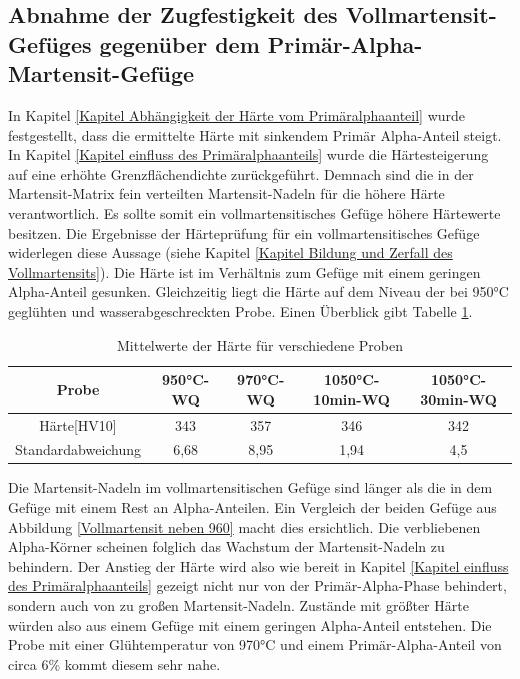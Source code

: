 \documentclass[a4paper, 11pt]{tubsreprt}
\begin{document}
\subsection*{Abnahme der Zugfestigkeit des Vollmartensit-Gefüges gegenüber dem Primär-Alpha-Martensit-Gefüge}
In Kapitel \ref{Kapitel Abhängigkeit der Härte vom Primäralphaanteil} wurde festgestellt, dass die ermittelte Härte mit sinkendem Primär Alpha-Anteil steigt. In Kapitel \ref{Kapitel einfluss des Primäralphaanteils} wurde die Härtesteigerung auf eine erhöhte Grenzflächendichte zurückgeführt. Demnach sind die in der Martensit-Matrix fein verteilten Martensit-Nadeln für die höhere Härte verantwortlich.
Es sollte somit ein vollmartensitisches Gefüge höhere Härtewerte besitzen.
Die Ergebnisse der Härteprüfung für ein vollmartensitisches Gefüge  widerlegen diese Aussage (siehe Kapitel \ref{Kapitel Bildung und Zerfall des Vollmartensits}). Die Härte ist im Verhältnis zum Gefüge mit einem geringen Alpha-Anteil gesunken. Gleichzeitig liegt die Härte auf dem Niveau der bei 950°C geglühten und wasserabgeschreckten Probe. Einen Überblick gibt Tabelle \ref{Tabelle Mittelwerte Härte für verschiedene Proben}.
\begin{table}
\begin{tabular}{c|c|c|c|c}
Probe & 950°C-WQ & 970°C-WQ & 1050°C-10min-WQ & 1050°C-30min-WQ \\
\hline
Härte[HV10] & 343 & 357 & 346 & 342 \\
\hline
Standardabweichung & 6,68 & 8,95 & 1,94 & 4,5 \\

\end{tabular}
\caption{Mittelwerte der Härte für verschiedene Proben}
\label{Tabelle Mittelwerte Härte für verschiedene Proben}
\end{table}

Die Martensit-Nadeln im vollmartensitischen Gefüge sind länger als die in dem Gefüge mit einem Rest an Alpha-Anteilen. Ein Vergleich der beiden Gefüge aus Abbildung \ref{Vollmartensit neben 960} macht dies ersichtlich. Die verbliebenen Alpha-Körner scheinen folglich das Wachstum der Martensit-Nadeln zu behindern. Der Anstieg der Härte wird also wie bereit in Kapitel \ref{Kapitel einfluss des Primäralphaanteils} gezeigt nicht nur von der Primär-Alpha-Phase behindert, sondern auch von zu großen Martensit-Nadeln. Zustände mit größter Härte würden also aus einem Gefüge mit einem geringen Alpha-Anteil entstehen. Die Probe mit einer Glühtemperatur von 970°C und einem Primär-Alpha-Anteil von circa 6\% kommt diesem sehr nahe.
\end{document}
